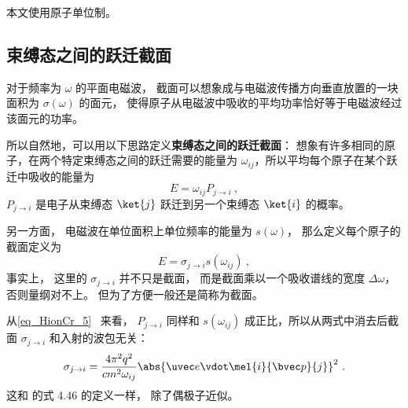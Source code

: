 
本文使用原子单位制。

\subsection{束缚态之间的跃迁截面}
对于频率为 $\omega$ 的平面电磁波， 截面可以想象成与电磁波传播方向垂直放置的一块面积为 $\sigma(\omega)$ 的面元， 使得原子从电磁波中吸收的平均功率恰好等于电磁波经过该面元的功率。

所以自然地，可以用以下思路定义\textbf{束缚态之间的跃迁截面}： 想象有许多相同的原子，在两个特定束缚态之间的跃迁需要的能量为 $\omega_{ij}$，所以平均每个原子在某个跃迁中吸收的能量为
\begin{equation}
E = \omega_{ij}P_{j\to i}~,
\end{equation}
$P_{j\to i}$ 是电子从束缚态 $\ket{j}$ 跃迁到另一个束缚态 $\ket{i}$ 的概率。

另一方面， 电磁波在单位面积上单位频率的能量为 $s(\omega)$， 那么定义每个原子的截面定义为
\begin{equation}
E = \sigma_{j\to i} s(\omega_{ij})~,
\end{equation}
事实上， 这里的 $\sigma_{j\to i}$ 并不只是截面， 而是截面乘以一个吸收谱线的宽度 $\Delta \omega$， 否则量纲对不上。 但为了方便一般还是简称为截面。

从\autoref{eq_HionCr_5}~ 来看， $P_{j\to i}$ 同样和 $s(\omega_{ij})$ 成正比，所以从两式中消去后截面 $\sigma_{j\to i}$ 和入射的波包无关：
\begin{equation}
\sigma_{j\to i} = \frac{4\pi^2 q^2}{c m^2 \omega_{ij}} \abs{\uvec e \vdot\mel{i}{\bvec p}{j}}^2~.
\end{equation}
这和 \cite{Bransden} 的式 4.46 的定义一样， 除了偶极子近似。


